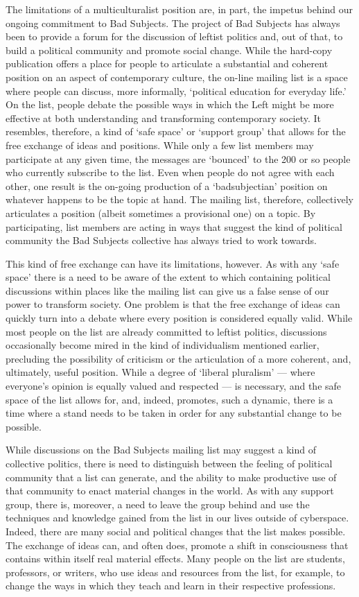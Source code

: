 \documentclass[letterpaper,12pt,english]{sphinxmanual}
\begin{document}
The limitations of a multiculturalist position are, in part, the impetus behind our ongoing commitment to Bad Subjects. The project of Bad Subjects has always been to provide a forum for the discussion of leftist politics and, out of that, to build a political community and promote social change. While the hard-copy publication offers a place for people to articulate a substantial and coherent position on an aspect of contemporary culture, the on-line mailing list is a space where people can discuss, more informally, `political education for everyday life.' On the list, people debate the possible ways in which the Left might be more effective at both understanding and transforming contemporary society. It resembles, therefore, a kind of `safe space' or `support group' that allows for the free exchange of ideas and positions. While only a few list members may participate at any given time, the messages are `bounced' to the 200 or so people who currently subscribe to the list. Even when people do not agree with each other, one result is the on-going production of a `badsubjectian' position on whatever happens to be the topic at hand. The mailing list, therefore, collectively articulates a position (albeit sometimes a provisional one) on a topic. By participating, list members are acting in ways that suggest the kind of political community the Bad Subjects collective has always tried to work towards.

This kind of free exchange can have its limitations, however. As with any `safe space' there is a need to be aware of the extent to which containing political discussions within places like the mailing list can give us a false sense of our power to transform society. One problem is that the free exchange of ideas can quickly turn into a debate where every position is considered equally valid. While most people on the list are already committed to leftist politics, discussions occasionally become mired in the kind of individualism mentioned earlier, precluding the possibility of criticism or the articulation of a more coherent, and, ultimately, useful position. While a degree of `liberal pluralism' — where everyone's opinion is equally valued and respected — is necessary, and the safe space of the list allows for, and, indeed, promotes, such a dynamic, there is a time where a stand needs to be taken in order for any substantial change to be possible.

While discussions on the Bad Subjects mailing list may suggest a kind of collective politics, there is need to distinguish between the feeling of political community that a list can generate, and the ability to make productive use of that community to enact material changes in the world. As with any support group, there is, moreover, a need to leave the group behind and use the techniques and knowledge gained from the list in our lives outside of cyberspace. Indeed, there are many social and political changes that the list makes possible. The exchange of ideas can, and often does, promote a shift in consciousness that contains within itself real material effects. Many people on the list are students, professors, or writers, who use ideas and resources from the list, for example, to change the ways in which they teach and learn in their respective professions.
\end{document}

